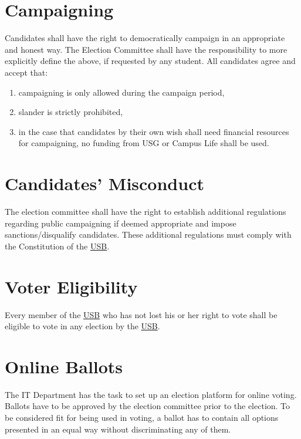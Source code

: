 \documentclass[12pt]{LaTeX_Misc/constitution}
\begin{document}
\section{Campaigning}
Candidates shall have the right to democratically campaign in an appropriate and honest way. The Election Committee shall have the responsibility to more explicitly define the above, if requested by any student. All candidates agree and accept that:
\begin{enumerate}[nosep] 
\item
campaigning is only allowed during the campaign period,
\item
slander is strictly prohibited,
\item
in the case that candidates by their own wish shall need financial resources for campaigning, no funding from USG or Campus Life shall be used.
\end{enumerate}


\section{Candidates' Misconduct} 
The election committee shall have the right to establish additional regulations regarding public campaigning if deemed appropriate and impose sanctions/disqualify candidates. These additional regulations must comply with the Constitution of the \hyperref[studentbody]{USB}.


\section{Voter Eligibility} 
Every member of the \hyperref[studentbody]{USB} who has not lost his or her right to vote shall be eligible to vote in any election by the \hyperref[studentbody]{USB}. 

\section{Online Ballots} 
The IT Department has the task to set up an election platform for online voting. Ballots have to be approved by the election committee prior to the election. To be considered fit for being used in voting, a ballot has to contain all options presented in an equal way without discriminating any of them.
\end{document}
